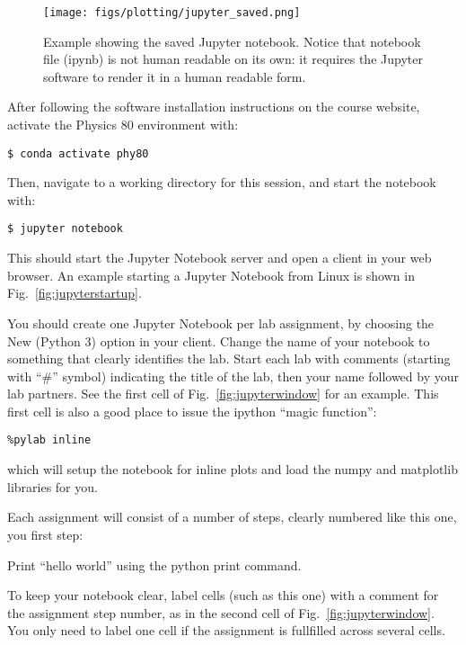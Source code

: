 \begin{figure}[htbp]
\begin{center}
\texttt{[image: figs/plotting/jupyter\_saved.png]} 
\caption{Example showing the saved Jupyter notebook.  Notice that notebook file (ipynb) is not human readable on its own: it requires the Jupyter software to render it in a human readable form.}
\label{fig:jupytersaved}
\end{center}
\end{figure}

After following the software installation instructions on the course
website, activate the Physics 80 environment with:
\begin{verbatim}
$ conda activate phy80
\end{verbatim}
Then, navigate to a working directory for this session, and start the notebook with:
\begin{verbatim}
$ jupyter notebook
\end{verbatim}
This should start the Jupyter Notebook server and open a client in your web browser.
An example starting a Jupyter Notebook from Linux is shown in Fig.~\ref{fig:jupyterstartup}.

You should create one Jupyter Notebook per lab assignment, by choosing
the New (Python 3) option in your client.  Change the name of your
notebook to something that clearly identifies the lab.  Start each lab
with comments (starting with ``\#'' symbol) indicating the title of
the lab, then your name followed by your lab partners.  See the first
cell of Fig.~\ref{fig:jupyterwindow} for an example.  This first cell
is also a good place to issue the ipython ``magic function'':
\begin{verbatim}
%pylab inline
\end{verbatim}
which will setup the notebook for inline plots and load the numpy and matplotlib libraries for you.

Each assignment will consist of a number of steps, clearly numbered like this one, you first step:

\begin{plot}
Print ``hello world'' using the python print command.
\end{plot}
\noindent
To keep your notebook clear, label cells (such as this one) with a
comment for the assignment step number, as in the second cell of
Fig.~\ref{fig:jupyterwindow}.  You only need to label one cell if
the assignment is fullfilled across several cells.

